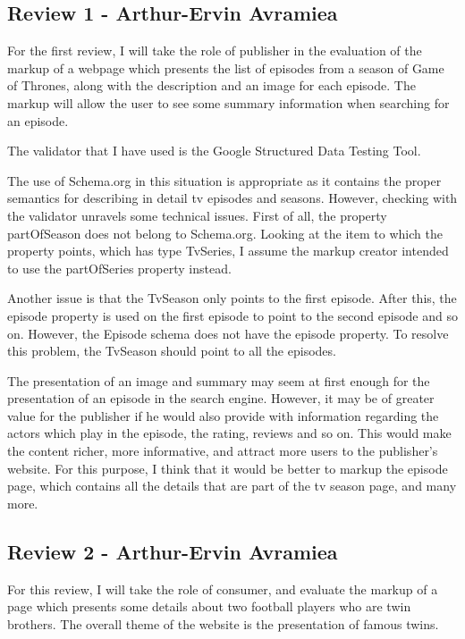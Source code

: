 \documentclass{acm_proc_10ptArticle-sp}
\begin{document}
\subsection{Review 1 - Arthur-Ervin Avramiea}

For the first review, I will take the role of publisher in the evaluation of the markup of a webpage which presents the list of episodes from a season of Game of Thrones, along with the description and an image for each episode. The markup will allow the user to see some summary information when searching for an episode. 

The validator that I have used is the Google Structured Data Testing Tool. 

The use of Schema.org in this situation is appropriate as it contains the proper semantics for describing in detail tv episodes and seasons. However, checking with the validator unravels some technical issues. First of all, the property partOfSeason does not belong to Schema.org. Looking at the item to which the property points, which has type TvSeries, I assume the markup creator intended to use the partOfSeries property instead.

Another issue is that the TvSeason only points to the first episode. After this, the episode property is used on the first episode to point to the second episode and so on. However, the Episode schema does not have the episode property. To resolve this problem, the TvSeason should point to all the episodes. 

The presentation of an image and summary may seem at first enough for the presentation of an episode in the search engine. However, it may be of greater value for the publisher if he would also provide with information regarding the actors which play in the episode, the rating, reviews and so on. This would make the content richer, more informative, and attract more users to the publisher's website. For this purpose, I think that it would be better to markup the episode page, which contains all the details that are part of the tv season page, and many more.

\subsection{Review 2 - Arthur-Ervin Avramiea}

For this review, I will take the role of consumer, and evaluate the markup of a page which presents some details about two football players who are twin brothers. The overall theme of the website is the presentation of famous twins.
\end{document}
